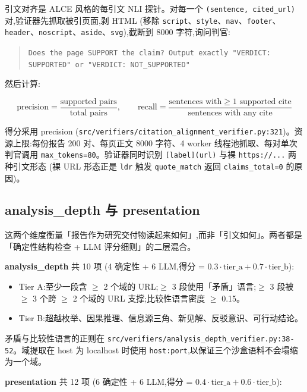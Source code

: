 \documentclass[UTF8,a4paper,12pt,oneside]{ctexart}
\begin{document}
引文对齐是 ALCE 风格的每引文 NLI 探针。对每一个 \texttt{(sentence, cited\_url)} 对,验证器先抓取被引页面,剥 HTML (移除 \texttt{script}、\texttt{style}、\texttt{nav}、\texttt{footer}、\texttt{header}、\texttt{noscript}、\texttt{aside}、\texttt{svg}),截断到 8000 字符,询问判官:

\begin{quote}
\small\texttt{Does the page SUPPORT the claim? Output exactly "VERDICT: SUPPORTED" or "VERDICT: NOT\_SUPPORTED"}
\end{quote}

然后计算:

\[
\text{precision} = \frac{\text{supported pairs}}{\text{total pairs}}, \qquad
\text{recall} = \frac{\text{sentences with} \geq 1 \text{ supported cite}}{\text{sentences with any cite}}
\]

得分采用 precision (\texttt{src/verifiers/citation\_alignment\_verifier.py:321})。资源上限:每份报告 200 对、每页正文 8000 字符、4 worker 线程池抓取、每对单次判官调用 \texttt{max\_tokens=80}。验证器同时识别 \texttt{[label](url)} 与裸 \texttt{https://...} 两种引文形态 (裸 URL 形态正是 \texttt{ldr} 触发 \texttt{quote\_match} 返回 \texttt{claims\_total=0} 的原因)。

\subsection{analysis\_depth 与 presentation}

这两个维度衡量「报告作为研究交付物读起来如何」,而非「引文如何」。两者都是「确定性结构检查 + LLM 评分细则」的二层混合。

\textbf{analysis\_depth} 共 10 项 (4 确定性 + 6 LLM,得分 = \(0.3 \cdot \text{tier\_a} + 0.7 \cdot \text{tier\_b}\)):

\begin{itemize}[leftmargin=2em]
\item Tier A:至少一段含 \(\geq\) 2 个域的 URL;\(\geq\) 3 段使用「矛盾」语言;\(\geq\) 3 段被 \(\geq\) 3 个跨 \(\geq\) 2 个域的 URL 支撑;比较性语言密度 \(\geq\) 0.15。
\item Tier B:超越枚举、因果推理、信息源三角、新见解、反驳意识、可行动结论。
\end{itemize}

矛盾与比较性语言的正则在 \texttt{src/verifiers/analysis\_depth\_verifier.py:38-52}。域提取在 host 为 localhost 时使用 \texttt{host:port},以保证三个沙盒语料不会塌缩为一个域。

\textbf{presentation} 共 12 项 (6 确定性 + 6 LLM,得分 = \(0.4 \cdot \text{tier\_a} + 0.6 \cdot \text{tier\_b}\)):
\end{document}

